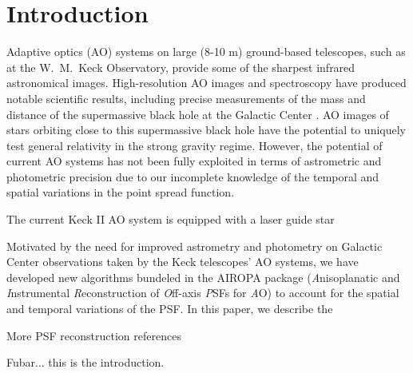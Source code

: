 \section{Introduction}

Adaptive optics (AO) systems on large (8-10 m)
ground-based telescopes, such as at the W.~M.~Keck Observatory,
provide some of the sharpest infrared astronomical images. 
High-resolution AO images and spectroscopy have produced 
notable scientific results, including precise measurements of the mass
and distance of the supermassive black hole at the Galactic Center \cite{Ghez:2008}. 
AO images of stars orbiting close to this supermassive black
hole have the potential to uniquely test general relativity in the strong
gravity regime. However, the potential of current AO systems has not been
fully exploited in terms of astrometric and photometric precision due
to our incomplete knowledge of the temporal and spatial variations in
the point spread function\cite{Lu:2014}. 

The current Keck II AO system is equipped with a laser guide star 


Motivated by the need for improved
astrometry and photometry on Galactic Center observations taken by the
Keck telescopes' AO systems, we have developed new algorithms bundeled
in the AIROPA package ({\it A}nisoplanatic and {\it I}nstrumental {\it
  R}econstruction of {\it O}ff-axis {\it P}SFs for {\it A}O) to
account for the spatial and temporal variations of the PSF. 
In this paper, we describe the 

More PSF reconstruction references \cite{Steinbring:2005,Davies:2012,Trippe:2010}

Fubar... this is the introduction. \cite{Britton:2006}


